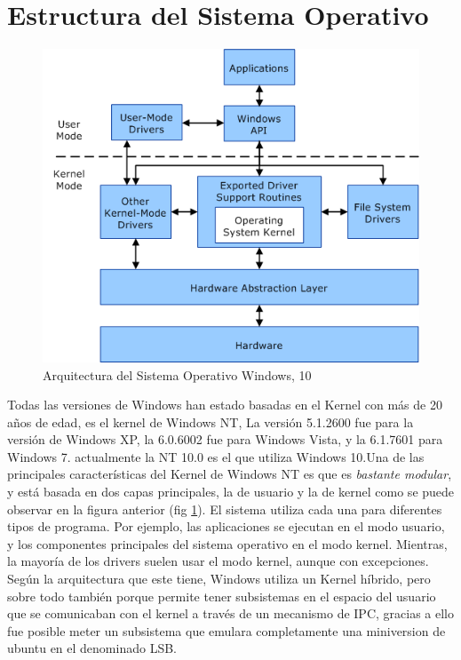 \documentclass[paper=a4, fontsize=12pt]{article} 		%
\numberwithin{equation}{section}						%
\numberwithin{table}{section} 							%
\begin{document}
\section{Estructura del Sistema Operativo}
\begin{figure}[H]
 \centering
\includegraphics[scale=0.45]{img/windowsds.png}
\caption{Arquitectura del Sistema Operativo Windows, 10}
\label{fig:dis4}
\end{figure}
Todas las versiones de Windows han estado basadas en el Kernel con más de 20 años de edad, es el kernel de Windows NT,  La versión 5.1.2600 fue para la versión de Windows XP, la 6.0.6002 fue para Windows Vista, y la 6.1.7601 para Windows 7. actualmente la NT 10.0 es  el que utiliza Windows 10.Una de las principales características del Kernel de Windows NT es que es \textit{bastante modular}, y está basada en dos capas principales, la de usuario y la de kernel como se puede observar en la figura anterior (fig \ref{fig:dis4}). El sistema utiliza cada una para diferentes tipos de programa. Por ejemplo, las aplicaciones se ejecutan en el modo usuario, y los componentes principales del sistema operativo en el modo kernel. Mientras, la mayoría de los drivers suelen usar el modo kernel, aunque con excepciones.
Según la arquitectura que este tiene, Windows utiliza un Kernel híbrido, pero sobre todo también porque permite tener subsistemas en el espacio del usuario que se comunicaban con el kernel a través de un mecanismo de IPC, gracias a ello fue posible meter un subsistema que emulara completamente una miniversion de ubuntu en el denominado LSB.
\end{document}
